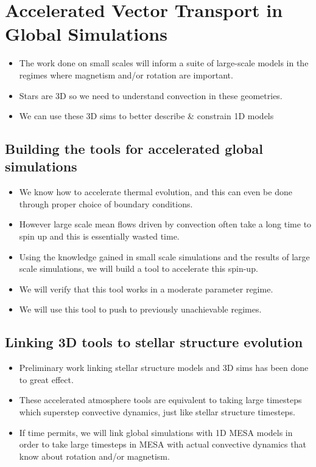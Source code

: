 \documentclass[aasms,12pt]{article}
\begin{document}
\section{Accelerated Vector Transport in Global Simulations}
\label{sct:global_models}

\begin{itemize}
\item The work done on small scales will inform a suite of large-scale models in the regimes where magnetism and/or rotation are important.
\item Stars are 3D so we need to understand convection in these geometries.
\item We can use these 3D sims to better describe \& constrain 1D models
\end{itemize}

\subsection{Building the tools for accelerated global simulations}

\begin{itemize}
\item We know how to accelerate thermal evolution, and this can even be done through proper choice of boundary conditions.
\item However large scale mean flows driven by convection often take a long time to spin up and this is essentially wasted time.
\item Using the knowledge gained in small scale simulations and the results of large scale simulations, we will build a tool to accelerate  this spin-up.
\item We will verify that this tool works in a moderate parameter regime.
\item We will use this tool to push to previously unachievable regimes.
\end{itemize}

\subsection{Linking 3D tools to stellar structure evolution}

\begin{itemize}
\item Preliminary work linking stellar structure models and 3D sims has been done to great effect.
\item These accelerated atmosphere tools are equivalent to taking large timesteps which superstep convective dynamics, just like stellar structure timesteps.
\item If time permits, we will link global simulations with 1D MESA models in order to take large timesteps in MESA with actual convective dynamics that know about rotation and/or magnetism.
\end{itemize}
\end{document}
